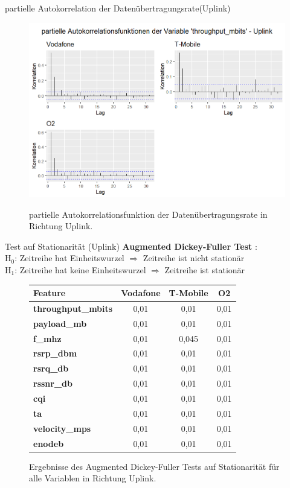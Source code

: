 \documentclass[10pt]{beamer}
\begin{document}
\begin{frame}{partielle Autokorrelation der Datenübertragungsrate(Uplink)}
	\begin{figure}
		\includegraphics[scale=0.38]{plots/arima/uplink/throughput_pacf}\\
		\caption{partielle Autokorrelationsfunktion der Datenübertragungsrate in Richtung Uplink.}
		\label{throughput_pacf}
	\end{figure}
\end{frame}

\begin{frame}{Test auf Stationarität (Uplink)}
	\textbf{Augmented Dickey-Fuller Test} \cite{time_series_analysis}:\\
	H$_0$: Zeitreihe hat Einheitswurzel $\Rightarrow$ Zeitreihe ist nicht stationär\\
	H$_1$: Zeitreihe hat keine Einheitswurzel $\Rightarrow$ Zeitreihe ist stationär
	\begin{figure}
		\begin{tabular}{l||c|c|c}
			\textbf{Feature} & \textbf{Vodafone} & \textbf{T-Mobile} & \textbf{O2} \\
			\hline\hline
			\textbf{throughput\_mbits} & 0,01 & 0,01 & 0,01 \\
			\textbf{payload\_mb} & 0,01 & 0,01 & 0,01 \\
			\textbf{f\_mhz} & 0,01 & 0,045 & 0,01 \\
			\textbf{rsrp\_dbm} & 0,01 & 0,01 & 0,01 \\
			\textbf{rsrq\_db} & 0,01 & 0,01 & 0,01 \\
			\textbf{rssnr\_db} & 0,01 & 0,01 & 0,01 \\
			\textbf{cqi} & 0,01 & 0,01 & 0,01 \\
			\textbf{ta} & 0,01 & 0,01 & 0,01 \\
			\textbf{velocity\_mps} & 0,01 & 0,01 & 0,01 \\
			\textbf{enodeb} & 0,01 & 0,01 & 0,01 \\
		\end{tabular}
		\caption{Ergebnisse des Augmented Dickey-Fuller Tests auf Stationarität für alle Variablen in Richtung Uplink.}
	\end{figure}
\end{frame}
\end{document}
